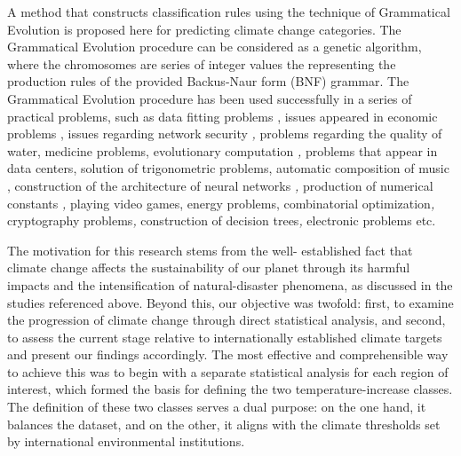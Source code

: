 \documentclass[12pt]{Definitions/academia}
\begin{document}
A method that constructs classification rules using the technique
of Grammatical Evolution \textit{\cite{O'Neill 2002}} is proposed
here for predicting climate change categories. The Grammatical Evolution
procedure can be considered as a genetic algorithm\textit{\cite{Kramer 2017}},
where the chromosomes are series of integer values the representing
the production rules of the provided Backus-Naur form (BNF) grammar\textit{\cite{Backus 1959}}.
The Grammatical Evolution procedure has been used successfully in
a series of practical problems, such as data fitting problems \textit{\cite{Ryan 1998,Neill 1999}},
issues appeared in economic problems \textit{\cite{Brabazon 2006}},
issues regarding network security \textit{\cite{Sen 2009},} problems
regarding the quality of water\textit{\cite{Chen 2008}}, medicine
problems\textit{\cite{Hidalgo 2014}}, evolutionary computation \textit{\cite{Tavares 2012},}
problems that appear in data centers\textit{\cite{Zapater 2016}},
solution of trigonometric problems\textit{\cite{Ryan 1998-1}}, automatic
composition of music \textit{\cite{de la Puente 2002}}, construction
of the architecture of neural networks \textit{\cite{De Campos 2016,Soltanian 2022},}
production of numerical constants \textit{\cite{Dempsey 2007},} playing
video games\textit{\cite{Galv=0000E1n-L=0000F3pez 2010,Shaker 2012}},
energy problems\textit{\cite{Mart=0000EDnez=002010Rodr=0000EDguez 2020}},
combinatorial optimization\textit{\cite{Sabar 2013},} cryptography
problems\textit{\cite{Ryan 2022},} construction of decision trees\textit{\cite{Pereira 2021},}
electronic problems\textit{\cite{Castej=0000F3n 2018} }etc.


The motivation for this research stems from the well- established fact that climate change affects the sustainability of our planet through its harmful impacts and the intensification of natural-disaster phenomena, as discussed in the studies referenced above. Beyond this, our objective was twofold: first, to examine the progression of climate change through direct statistical analysis, and second, to assess the current stage relative to internationally established climate targets and present our findings accordingly.
The most effective and comprehensible way to achieve this was to begin with a separate statistical analysis for each region of interest, which formed the basis for defining the two temperature-increase classes. The definition of these two classes serves a dual purpose: on the one hand, it balances the dataset, and on the other, it aligns with the climate thresholds set by international environmental institutions.
\end{document}
